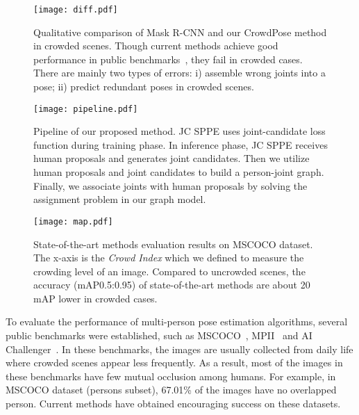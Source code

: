 \documentclass[10pt,twocolumn,letterpaper]{article}
\begin{document}
\begin{figure}[tb]
\begin{center}
\texttt{[image: diff.pdf]}
\end{center}
   \caption{Qualitative comparison of Mask R-CNN and our CrowdPose method in crowded scenes. Though current methods achieve good performance in public benchmarks~\cite{mpii, mscoco, aic}, they fail in crowded cases. There are mainly two types of errors: i) assemble wrong joints into a pose; ii) predict redundant poses in crowded scenes.}
\label{fig:diff}
\vspace{-0.15in}
\end{figure}


\begin{figure*}[!t]
\begin{center}
\texttt{[image: pipeline.pdf]}
\end{center}
   \caption{Pipeline of our proposed method. JC SPPE uses joint-candidate loss function during training phase. In inference phase, JC SPPE receives human proposals and generates joint candidates. Then we utilize human proposals and joint candidates to build a person-joint graph. Finally, we associate joints with human proposals by solving the assignment problem in our graph model.}
\label{fig:Pipeline}
\vspace{-0.15in}
\end{figure*}
\begin{figure}[tb]
\begin{center}
\texttt{[image: map.pdf]}
\end{center}
   \caption{State-of-the-art methods evaluation results on MSCOCO dataset. The x-axis is the \textit{Crowd Index} which we defined to measure the crowding level of an image. Compared to uncrowded scenes, the accuracy (mAP0.5:0.95) of state-of-the-art methods are about 20 mAP lower in crowded cases.}
\label{fig:map}
\vspace{-0.15in}
\end{figure} 

To evaluate the performance of multi-person pose estimation algorithms, several public benchmarks were established, such as MSCOCO~\cite{mscoco}, MPII~\cite{mpii} and AI Challenger~\cite{aic}. In these benchmarks, the images are usually collected from daily life where crowded scenes appear less frequently. As a result, most of the images in these benchmarks have few mutual occlusion among humans. For example, in MSCOCO dataset (persons subset), 67.01\% of the images have no overlapped person. Current methods have obtained encouraging success on these datasets.
\end{document}
